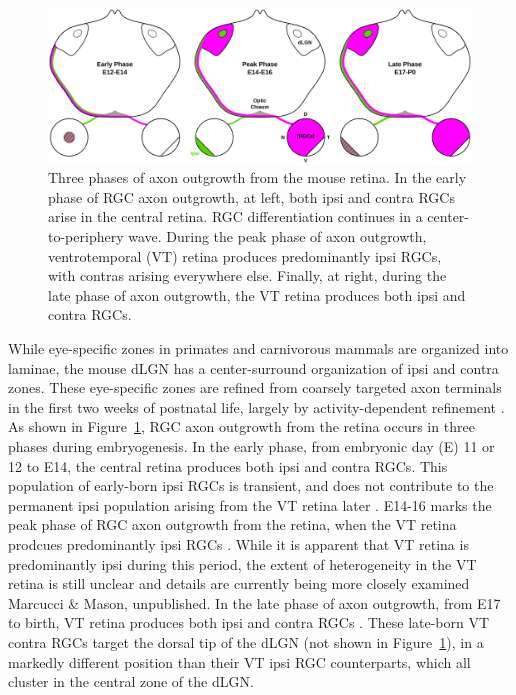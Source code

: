\begin{figure}[hbtp]
	\begin{center}
		\includegraphics[width=\textwidth]{Figures/RGP_DevSeries.svg}
		\caption{Three phases of axon outgrowth from the mouse retina. In the early phase of RGC axon outgrowth, at left, both ipsi and contra RGCs arise in the central retina. RGC differentiation continues in a center-to-periphery wave. During the peak phase of axon outgrowth, ventrotemporal (VT) retina produces predominantly ipsi RGCs, with contras arising everywhere else. Finally, at right, during the late phase of axon outgrowth, the VT retina produces both ipsi and contra RGCs.}
		\label{Figures/RGP_DevSeries}
	\end{center}
\end{figure}
While eye-specific zones in primates and carnivorous mammals are organized into laminae, the mouse dLGN has a center-surround organization of ipsi and contra zones.
These eye-specific zones are refined from coarsely targeted axon terminals in the first two weeks of postnatal life, largely by activity-dependent refinement \cite{huberman2008mechanisms,feldheim2010visual}.
As shown in Figure~\ref{Figures/RGP_DevSeries}, RGC axon outgrowth from the retina occurs in three phases during embryogenesis.
In the early phase, from embryonic day (E) 11 or 12 to E14, the central retina produces both ipsi and contra RGCs.
This population of early-born ipsi RGCs is transient, and does not contribute to the permanent ipsi population arising from the VT retina later \cite{drager1985birth,colello1990early,soares2015transient}.
E14-16 marks the peak phase of RGC axon outgrowth from the retina, when the VT retina prodcues predominantly ipsi RGCs \cite{drager1985birth,petros2008retinal}.
While it is apparent that VT retina is predominantly ipsi during this period, the extent of heterogeneity in the VT retina is still unclear and details are currently being more closely examined {Marcucci \& Mason, unpublished}.
In the late phase of axon outgrowth, from E17 to birth, VT retina produces both ipsi and contra RGCs \cite{drager1985birth,petros2008retinal}.
These late-born VT contra RGCs target the dorsal tip of the dLGN (not shown in Figure~\ref{Figures/RGP_DevSeries}), in a markedly different position than their VT ipsi RGC counterparts, which all cluster in the central zone of the dLGN.